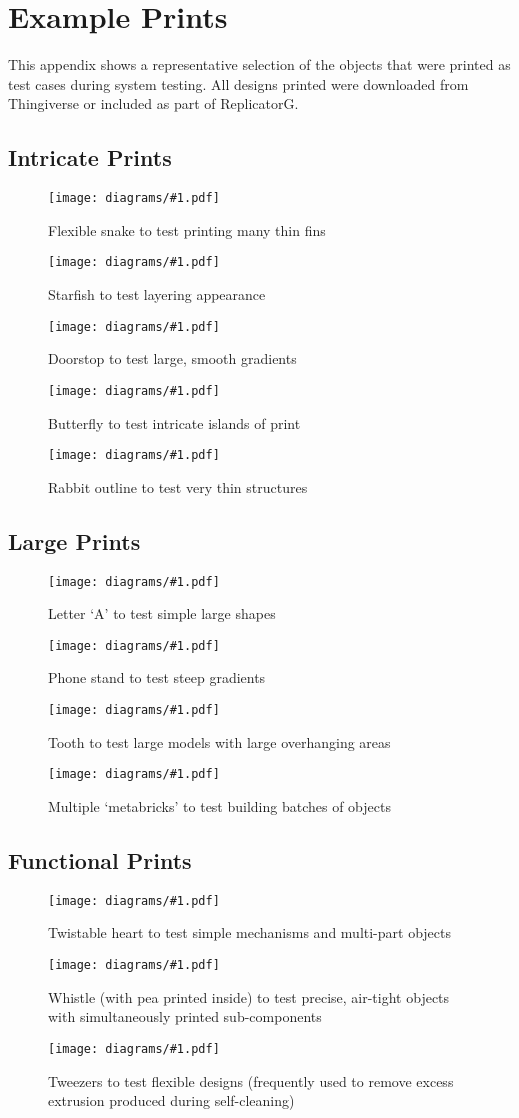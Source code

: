 \chapter{Example Prints}
	
	\label{sec:examplePrints}
	
	\newcommand{\examplePrint}[2]{
		\begin{figure}[H]
			\texttt{[image: diagrams/\#1.pdf]}
			\caption{#2}
			\label{fig:#1}
		\end{figure}
	}
	
	This appendix shows a representative selection of the objects that were
	printed as test cases during system testing. All designs printed were
	downloaded from Thingiverse or included as part of ReplicatorG.
	
	\section{Intricate Prints}
		
		\examplePrint{snake}{Flexible snake to test printing many thin fins}
		
		\examplePrint{starfish}{Starfish to test layering appearance}
		
		\examplePrint{doorstop}{Doorstop to test large, smooth gradients}
		
		\examplePrint{butterfly}{Butterfly to test intricate islands of print}
		
		\examplePrint{rabbit}{Rabbit outline to test very thin structures}
		
	\section{Large Prints}
		
		\examplePrint{letter}{Letter `A' to test simple large shapes}
		
		\examplePrint{phoneDock}{Phone stand to test steep gradients}
		
		\examplePrint{tooth}{Tooth to test large models with large overhanging areas}
		
		\examplePrint{joblot}{Multiple `metabricks' to test building batches of objects}
		
	\section{Functional Prints}
		
		\examplePrint{heart}{Twistable heart to test simple mechanisms and
		                     multi-part objects}
		
		\examplePrint{whistle}{Whistle (with pea printed inside) to test precise,
		                       air-tight objects with simultaneously printed
		                       sub-components}
		
		\examplePrint{tweezers}{Tweezers to test flexible designs (frequently used
		                        to remove excess extrusion produced during
		                        self-cleaning)}
